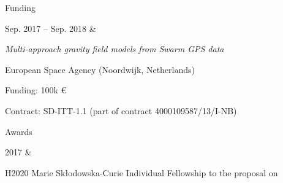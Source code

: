 \documentclass[a4paper,12pt]{article}
\newcommand{\dynhref}[2]{%
  \iftoggle{expliciturl}{%
    #2 \footnote{\href{http://#1}{\detokenize{#1}}}%
  }{%
    \href{http://#1}{#2}%
  }%
}
\begin{document}


\begin{cvsection}{Funding}

Sep. 2017 -- Sep. 2018 & 
  \begin{itti}
    \item \emph{Multi-approach gravity field models from Swarm GPS data}
    \begin{ittib}
      \item European Space Agency (Noordwijk, Netherlands)
      \item Funding: 100k \euro
      \item Contract: SD-ITT-1.1 (part of contract 4000109587/13/I-NB)
    \end{ittib}
  \end{itti}

\end{cvsection}


\begin{cvsection}{Awards}

2017 &
  \begin{itti}
    \item H2020 Marie Sk\l{}odowska-Curie Individual Fellowship \dynhref{ec.europa.eu/research/soe/index.cfm?pg=what}{Seal of Excellent} to the proposal on \dynhref{jgte.github.io/permalinks/H2020_MSCA_IF_2017_Seal_of_Excellence-jgte.pdf}{\emph{Direct Gravimetric data assimilation into Geophysical models}}
  \end{itti}

\end{cvsection}

\end{document}
